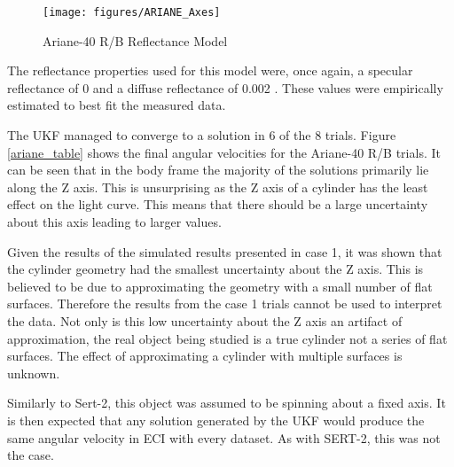 \begin{figure}[ht]
	\begin{center}
		\texttt{[image: figures/ARIANE\_Axes]}
	\end{center}
\caption{Ariane-40 R/B Reflectance Model}
\end{figure}



The reflectance properties used for this model were, once again, a specular reflectance of 0 and a diffuse reflectance of 0.002 . These values were empirically estimated to best fit the measured data.

The UKF managed to converge to a solution in 6 of the 8 trials. Figure \ref{ariane_table} shows the final angular velocities for the Ariane-40 R/B trials. It can be seen that in the body frame the majority of the solutions primarily lie along the Z axis. This is unsurprising as the Z axis of a cylinder has the least effect on the light curve. This means that there should be a large uncertainty about this axis leading to larger values.

Given the results of the simulated results presented in case 1, it was shown that the cylinder geometry had the smallest uncertainty about the Z axis. This is believed to be due to approximating the geometry with a small number of flat surfaces. Therefore the results from the case 1 trials cannot be used to interpret the data. Not only is this low uncertainty about the Z axis an artifact of approximation, the real object being studied is a true cylinder not a series of flat surfaces. The effect of approximating a cylinder with multiple surfaces is unknown. 

Similarly to Sert-2, this object was assumed to be spinning about a fixed axis. It is then expected that any solution generated by the UKF would produce the same angular velocity in ECI with every dataset. As with SERT-2, this was not the case.

